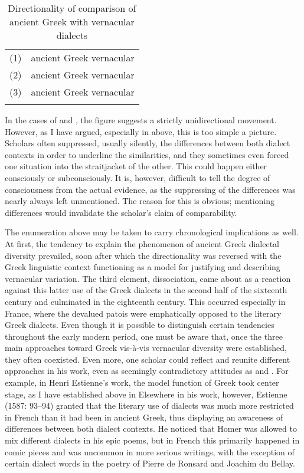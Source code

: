 \begin{table}
\caption{Directionality of comparison of ancient Greek with vernacular dialects}

\begin{tabularx}{\textwidth}{XX}
\lsptoprule
(1)
         & %
ancient Greek                vernacular\\
(2)
         & %
ancient Greek                vernacular\\
(3)

         & %
ancient Greek                vernacular\\
\lspbottomrule
\end{tabularx}
\end{table}
In the cases of  and , the figure suggests a strictly unidirectional movement. However, as I have argued, especially in  above, this is too simple a picture. Scholars often suppressed, usually silently, the differences between both dialect contexts in order to underline the similarities, and they sometimes even forced one situation into the straitjacket of the other. This could happen either consciously or subconsciously. It is, however, difficult to tell the degree of consciousness from the actual evidence, as the suppressing of the differences was nearly always left unmentioned. The reason for this is obvious; mentioning differences would invalidate the scholar’s claim of comparability.

The enumeration above may be taken to carry chronological implications as well. At first, the tendency to explain the phenomenon of ancient Greek dialectal diversity prevailed, soon after which the directionality was reversed with the Greek linguistic context functioning as a model for justifying and describing vernacular variation. The third element, dissociation, came about as a reaction against this latter use of the Greek dialects in the second half of the sixteenth century and culminated in the eighteenth century. This occurred especially in France, where the devalued patois were emphatically opposed to the literary Greek dialects. Even though it is possible to distinguish certain tendencies throughout the early modern period, one must be aware that, once the three main approaches toward Greek vis-à-vis vernacular diversity were established, they often coexisted. Even more, one scholar could reflect and reunite different approaches in his work, even as seemingly contradictory attitudes as  and . For example, in Henri Estienne’s work, the model function of Greek took center stage, as I have established above in  Elsewhere in his work, however, Estienne (1587: 93–94) granted that the literary use of dialects was much more restricted in French than it had been in ancient Greek, thus displaying an awareness of differences between both dialect contexts. He noticed that Homer was allowed to mix different dialects in his epic poems, but in French this primarily happened in comic pieces and was uncommon in more serious writings, with the exception of certain dialect words in the poetry of Pierre de Ronsard and Joachim du Bellay.

